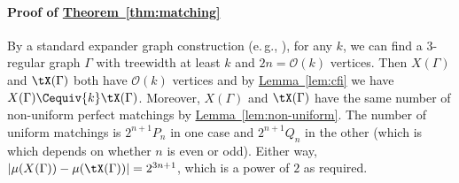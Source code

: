 \documentclass[11pt]{article}
\newcommand{\expref}[2]{\texorpdfstring{\hyperref[#2]{#1~\ref{#2}}}{#1~\ref{#2}}}
\newcommand{\eg}{e.\,g.}
\begin{document}
\paragraph{Proof of \expref{Theorem}{thm:matching}}
By a standard expander graph construction (\eg, \cite{Ajtai94}), for any $k$, we
can find a $3$-regular graph $\Gamma$ with treewidth at least $k$ and $2n =
\mathcal{O}(k)$ vertices. Then $X(\Gamma)$ and $\tX(\Gamma)$ both have $\mathcal{O}(k)$
vertices and by \expref{Lemma}{lem:cfi} we have $X(\Gamma) \Cequiv{k} \tX(\Gamma)$. Moreover,
$X(\Gamma)$ and $\tX(\Gamma)$ have the same number of non-uniform perfect matchings by
\expref{Lemma}{lem:non-uniform}. The number of uniform matchings is $2^{n+1}P_n$ in
one case and $2^{n+1}Q_n$ in the other (which is which depends on whether $n$ is
even or odd). Either way, $ |\mu(X(\Gamma)) - \mu(\tX(\Gamma))| = 2^{3n+1}$, which is a
power of $2$ as required.
\end{document}
